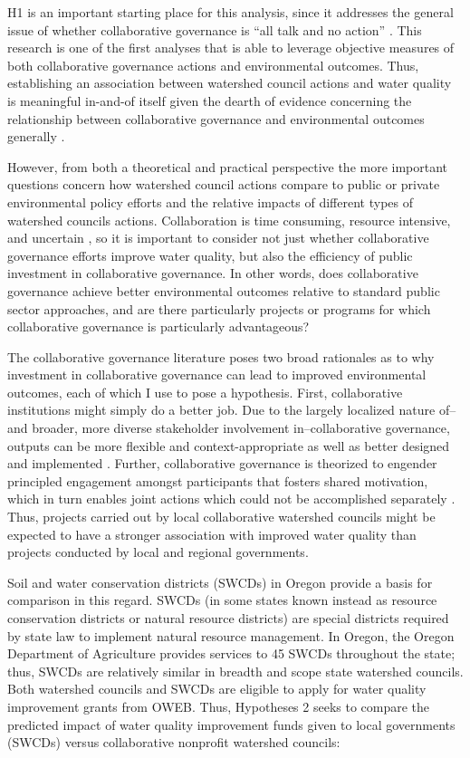 \documentclass[12pt,a4paper,titlepage]{article}
\begin{document}
H1 is an important starting place for this analysis, since it addresses the general issue of whether collaborative governance is “all talk and no action” \parencite{lubell2004}. This research is one of the first analyses that is able to leverage objective measures of both collaborative governance actions and environmental outcomes. Thus, establishing an association between watershed council actions and water quality is meaningful in-and-of itself given the dearth of evidence concerning the relationship between collaborative governance and environmental outcomes generally \parencite{carr2012,koontz2006, newig2009}. 

However, from both a theoretical and practical perspective the more important questions concern how watershed council actions compare to public or private environmental policy efforts and the relative impacts of different types of watershed councils actions. Collaboration is time consuming, resource intensive, and uncertain \parencite{margerum2011}, so it is important to consider not just whether collaborative governance efforts improve water quality, but also the efficiency of public investment in collaborative governance. In other words, does collaborative governance achieve better environmental outcomes relative to standard public sector approaches, and are there particularly projects or programs for which collaborative governance is particularly advantageous?

The collaborative governance literature poses two broad rationales as to why investment in collaborative governance can lead to improved environmental outcomes, each of which I use to pose a hypothesis. First, collaborative institutions might simply do a better job. Due to the largely localized nature of--and broader, more diverse stakeholder involvement in--collaborative governance, outputs can be more flexible and context-appropriate \parencite{nikolic2008} as well as better designed and implemented \parencite{sabatier2005}. Further, collaborative governance is theorized to engender principled engagement amongst participants that fosters shared motivation, which in turn enables joint actions which could not be accomplished separately \parencite{emerson2012}. Thus, projects carried out by local collaborative watershed councils might be expected to have a stronger association with improved water quality than projects conducted by local and regional governments. 

Soil and water conservation districts (SWCDs) in Oregon provide a basis for comparison in this regard. SWCDs (in some states known instead as resource conservation districts or natural resource districts) are special districts required by state law to implement natural resource management. In Oregon, the Oregon Department of Agriculture provides services to 45 SWCDs throughout the state; thus, SWCDs are relatively similar in breadth and scope state watershed councils. Both watershed councils and SWCDs are eligible to apply for water quality improvement grants from OWEB. Thus, Hypotheses 2 seeks to compare the predicted impact of water quality improvement funds given to local governments (SWCDs) versus collaborative nonprofit watershed councils: 
\end{document}

